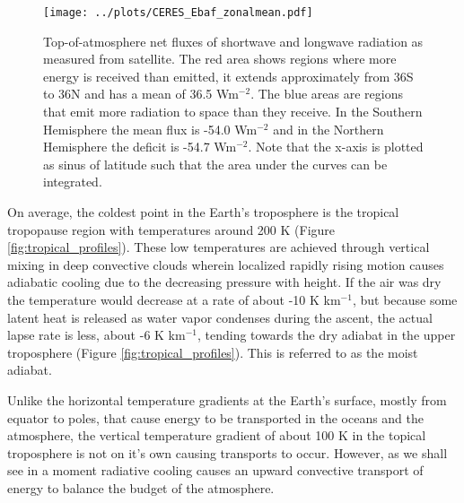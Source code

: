 \documentclass[12pt]{book}
\begin{document}
\begin{figure}
\begin{center}
\texttt{[image: ../plots/CERES\_Ebaf\_zonalmean.pdf]}
\end{center}
\caption{ Top-of-atmosphere net fluxes of shortwave and longwave radiation as measured from satellite. The red area shows regions where more energy is received than emitted, it extends approximately from 36S to 36N and has a mean of 36.5 Wm$^{-2}$. The blue areas are regions that emit more radiation to space than they receive. In the Southern Hemisphere the mean flux is -54.0 Wm$^{-2}$ and in the Northern Hemisphere the deficit is -54.7 Wm$^{-2}$. Note that the x-axis is plotted as sinus of latitude such that the area under the curves can be integrated. } 
\label{fig:ceres_fluxes}
\end{figure}

On average, the coldest point in the Earth's troposphere is the tropical tropopause region with temperatures around 200 K (Figure \ref{fig:tropical_profiles}). These low temperatures are achieved through vertical mixing in deep convective clouds wherein localized rapidly rising motion causes adiabatic cooling due to the decreasing pressure with height. If the air was dry the temperature would decrease at a rate of about -10 K km$^{-1}$, but because some latent heat is released as water vapor condenses during the ascent, the actual lapse rate is less, about -6 K km$^{-1}$, tending towards the dry adiabat in the upper troposphere (Figure \ref{fig:tropical_profiles}). This is referred to as the moist adiabat.

Unlike the horizontal temperature gradients at the Earth's surface, mostly from equator to poles, that cause energy to be transported in the oceans and the atmosphere, the vertical temperature gradient of about 100 K in the topical troposphere is not on it's own causing transports to occur. However, as we shall see in a moment radiative cooling causes an upward convective  transport of energy to balance the budget of the atmosphere.
\end{document}
